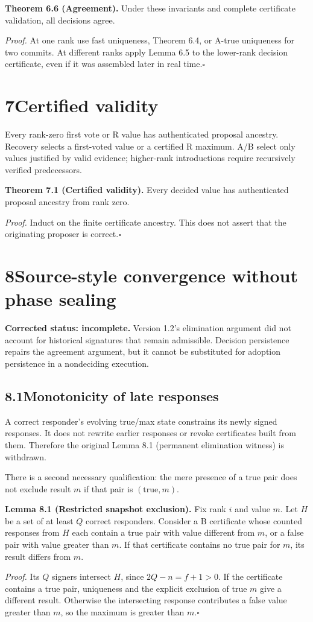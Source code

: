 \documentclass[11pt,a4paper]{article}
\newcommand{\page}[1]{\clearpage\setcounter{page}{#1}}
\newcommand{\claim}[2]{\par\textbf{#1.} #2\par}
\begin{document}
\claim{Theorem 6.6 (Agreement)}{Under these invariants and complete certificate validation, all decisions agree.}
\textit{Proof.} At one rank use fast uniqueness, Theorem 6.4, or A-true uniqueness for two commits. At different ranks apply Lemma 6.5 to the lower-rank decision certificate, even if it was assembled later in real time.\hfill$\square$
\page{11}
\section*{7\quad Certified validity}
Every rank-zero first vote or R value has authenticated proposal ancestry. Recovery selects a first-voted value or a certified R maximum. A/B select only values justified by valid evidence; higher-rank introductions require recursively verified predecessors.
\claim{Theorem 7.1 (Certified validity)}{Every decided value has authenticated proposal ancestry from rank zero.}
\textit{Proof.} Induct on the finite certificate ancestry. This does not assert that the originating proposer is correct.\hfill$\square$
\section*{8\quad Source-style convergence without phase sealing}
\textbf{Corrected status: incomplete.} Version 1.2's elimination argument did not account for historical signatures that remain admissible. Decision persistence repairs the agreement argument, but it cannot be substituted for adoption persistence in a nondeciding execution.
\subsection*{8.1\quad Monotonicity of late responses}
A correct responder's evolving true/max state constrains its newly signed responses. It does not rewrite earlier responses or revoke certificates built from them. Therefore the original Lemma 8.1 (permanent elimination witness) is withdrawn.

There is a second necessary qualification: the mere presence of a true pair does not exclude result $m$ if that pair is $(\mathrm{true},m)$.
\claim{Lemma 8.1 (Restricted snapshot exclusion)}{Fix rank $i$ and value $m$. Let $H$ be a set of at least $Q$ correct responders. Consider a B certificate whose counted responses from $H$ each contain a true pair with value different from $m$, or a false pair with value greater than $m$. If that certificate contains no true pair for $m$, its result differs from $m$.}
\textit{Proof.} Its $Q$ signers intersect $H$, since $2Q-n=f+1>0$. If the certificate contains a true pair, uniqueness and the explicit exclusion of true $m$ give a different result. Otherwise the intersecting response contributes a false value greater than $m$, so the maximum is greater than $m$.\hfill$\square$
\end{document}
